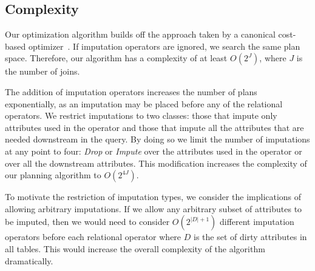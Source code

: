 %
%
%
%
%
%

\subsection{Complexity}\label{sec:complexity}
Our optimization algorithm builds off the approach taken by 
a canonical cost-based optimizer~\cite{blasgen1981system}.
If imputation operators are ignored, we search the same plan space.
Therefore, our algorithm has a complexity of at least $O(2^J)$, where $J$ is the number of joins.

The addition of imputation operators increases the number of plans exponentially, as an imputation may be placed before any of the relational operators.
We restrict imputations to two classes: those that impute only attributes used in the operator and those that impute all the attributes that are needed downstream in the query.
By doing so we limit the number of imputations at any point to four: \textit{Drop} or \textit{Impute} over the attributes used in the operator or over all the downstream attributes.
This modification increases the complexity of our planning algorithm to $O(2^{4J})$.

To motivate the restriction of imputation types, we consider the implications of allowing arbitrary imputations.
If we allow any arbitrary subset of attributes to be imputed, then we would need to consider $O(2^{|D|+1})$ different imputation operators before each relational operator where $D$ is the set of dirty attributes in all tables.
This would increase the overall complexity of the algorithm dramatically.


